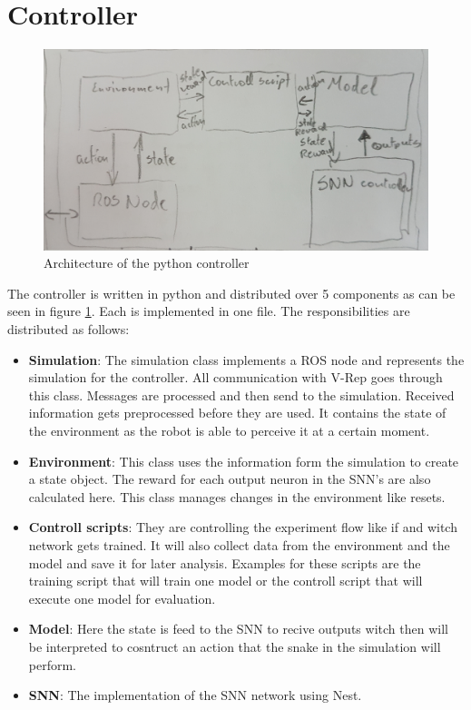 \section{Controller}

\begin{figure}
	\includegraphics[width=\linewidth]{images/controller.jpg}
	\caption{Architecture of the python controller}
	\label{fig:controller}
\end{figure}

The controller is written in python and distributed over 5 components as can be seen in figure \ref{fig:controller}. Each is implemented in one file. The responsibilities are distributed as follows:

\begin{itemize}
	\item \textbf{Simulation}: The simulation class implements a ROS node and represents the simulation for the controller. All communication with V-Rep goes through this class. Messages are processed and then send to the simulation. Received information gets preprocessed before they are used. It contains the state of the environment as the robot is able to perceive it at a certain moment.
	\item \textbf{Environment}: This class uses the information form the simulation to create a state object. The reward for each output neuron in the SNN's are also calculated here. This class manages changes in the environment like resets.
	\item \textbf{Controll scripts}: They are controlling the experiment flow like if and witch network gets trained. It will also collect data from the environment and the model and save it for later analysis. Examples for these scripts are the training script that will train one model or the controll script that will execute one model for evaluation.
	\item \textbf{Model}: Here the state is feed to the SNN to recive outputs witch then will be interpreted to cosntruct an action that the snake in the simulation will perform.
	\item \textbf{SNN}: The implementation of the SNN network using Nest.
\end{itemize}

